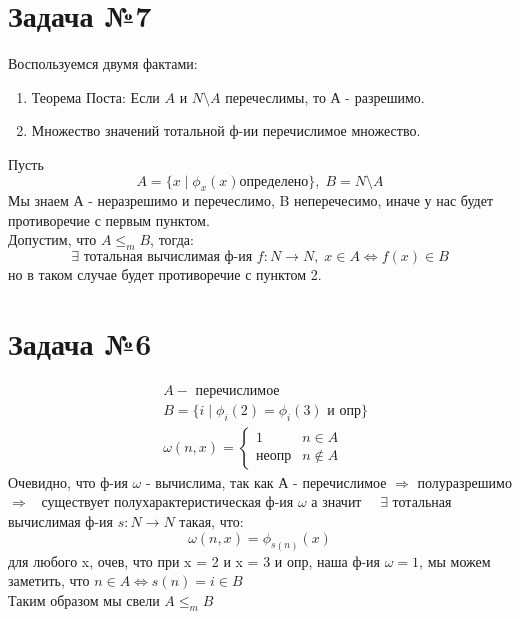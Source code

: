 \documentclass[a4paper,12pt]{article} %
\begin{document}
\section*{Задача №7}
Воспользуемся двумя фактами:
\begin{enumerate}
    \item Теорема Поста: 
    Если $A$ и $N \setminus A$ перечеслимы, то $А$ - разрешимо.
    \item Множество значений тотальной ф-ии перечислимое множество.
\end{enumerate}
Пусть 
\begin{equation*}
    A = \{x \;| \;\phi_x(x) определено\}, \; B = N \setminus A  
\end{equation*}
Мы знаем А - неразрешимо и перечеслимо, B неперечесимо, 
иначе у нас будет противоречие с первым пунктом.\\
Допустим, что $A \leq_m B$, тогда:
\[\exists \text{ тотальная вычислимая ф-ия } f: N \rightarrow N, \; x \in A \Leftrightarrow f(x) \in B \]
но в таком случае будет противоречие с пунктом 2. 

\section*{Задача №6}

\begin{align*}
    &A - \text{ перечислимое } \\
    &B = \{i \; | \; \phi_i(2) = \phi_i(3) \text{ и опр}\} \\
    &\omega(n, x) = \begin{cases}
        1 &n \in A\\
        неопр &n \notin A
    \end{cases} 
\end{align*} 
Очевидно, что ф-ия $\omega$ - вычислима, так как А - перечислимое $\Rightarrow$ полуразрешимо 
$\Rightarrow$  существует полухарактеристическая ф-ия $\omega$
а значит   $\exists $ тотальная вычислимая ф-ия  $s: N \rightarrow N$ такая, что:
\[\omega(n,x) = \phi_{s(n)}(x)\] 
для любого x, очев, что при x = 2  и x = 3 и опр, наша ф-ия $\omega = 1$,
мы можем заметить, что $n \in A \Leftrightarrow s(n) = i \in B$ \\
Таким образом мы свели $ A \leq_m B$
\end{document}
